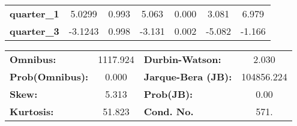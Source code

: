 \begin{center}
\begin{tabular}{lcccccc}
\textbf{quarter\_1}             &       5.0299  &        0.993     &     5.063  &         0.000        &        3.081    &        6.979     \\
\textbf{quarter\_3}             &      -3.1243  &        0.998     &    -3.131  &         0.002        &       -5.082    &       -1.166     \\
\bottomrule
\end{tabular}
\end{center}\begin{center}
\begin{tabular}{lclc}
\toprule
\textbf{Omnibus:}       & 1117.924 & \textbf{  Durbin-Watson:     } &     2.030   \\
\textbf{Prob(Omnibus):} &   0.000  & \textbf{  Jarque-Bera (JB):  } & 104856.224  \\
\textbf{Skew:}          &   5.313  & \textbf{  Prob(JB):          } &      0.00   \\
\textbf{Kurtosis:}      &  51.823  & \textbf{  Cond. No.          } &      571.   \\
\bottomrule
\end{tabular}
\end{center}